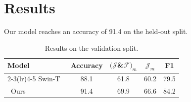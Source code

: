 \documentclass{article}
\newcommand{\gr}{\rowcolor[gray]{.95}}
\begin{document}
\section{Results}

Our model reaches an accuracy of 91.4 on the held-out split.

\begin{table}
\caption{Results on the validation split.}
\begin{tabular}{lcccc}
\toprule
Model & \hspace{-0.3em}Accuracy\hspace{-0.3em} & $ (\mathcal{J}$\&$\mathcal{F})_m$ & $\mathcal{J}_m$ & F1 \\
\cmidrule(lr){2-3}\cmidrule(lr){4-5}
Swin-T~\cite{liu2021swin} & \hspace{-0.9em}88.1\hspace{-0.4em} & 61.8 & 60.2 & 79.5 \\
\gr \,
    Ours & \hspace{-0.9em}91.4\hspace{-0.4em} & 69.9 & 66.6 & 84.2 \\
\bottomrule
\end{tabular}
\end{table}
\end{document}
